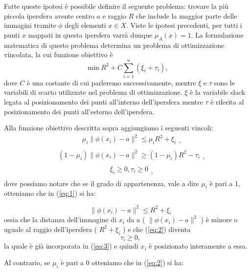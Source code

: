 \documentclass[12pt,italian]{report}
\begin{document}
Fatte queste ipotesi è possibile definire il seguente problema:
trovare la più piccola ipersfera avente centro $a$ e raggio $R$ che include la maggior parte delle immagini tramite $ \phi $ degli elementi $ x \in X $. Viste le ipotesi precedenti, per tutti i punti $ x $ mappati in questa ipersfera varrà dunque $ \mu_A(x) = 1 $. La formulazione matematica di questo problema determina un problema di ottimizzazione vincolata, la cui funzione obiettivo è
\[ \min R^2 + C\sum_{i=1}^{n} (\xi_{i} + \tau_{i}), \]
dove $ C $ è una costante di cui parleremo successivamente, mentre $ \xi $ e $ \tau $ sono le variabili di scarto utilizzate nel problema di ottimizzazione. $ \xi $ è la variabile slack legata al posizionamento dei punti all'interno dell'ipersfera mentre $ \tau $ è riferita al posizionamento dei punti all'esterno dell'ipersfera.

Alla funzione obiettivo descritta sopra aggiungiamo i seguenti vincoli:
\begin{equation}
\label{eq:1}
\begin{aligned}
\quad \mu_{i} \lVert \phi(x_{i}) - a \rVert ^2 \leq \mu_{i} R^2 + \xi_{i}\\
\end{aligned},
\end{equation}
\begin{equation}
\label{eq:2}
\begin{aligned}
\quad (1 - \mu_{i}) \lVert \phi(x_{i}) - a \rVert ^2 \geq (1 - \mu_{i})R^2 - \tau_{i} \\
\end{aligned},
\end{equation}
\begin{equation}
\label{eq:3}
\begin{aligned}
\quad \xi_{i} \geq 0, \tau_{i} \geq 0 \\
\end{aligned},
\end{equation}
dove possiamo notare che se il grado di appartenenza, vale a dire $  \mu_{i} $ è pari a 1, otteniamo che in (\ref{eq:1}) si ha:

\[\quad \lVert \phi(x_{i}) - a \rVert ^2 \leq R^2 + \xi_{i} \]
ossia che la distanza dell'immagine di $ x_{i} $ da $a$ ( $\lVert \phi(x_{i}) - a \rVert ^2$ ) è minore o uguale al raggio dell'ipersfera ( $R^2 + \xi_{i}$ ) e che (\ref{eq:2}) diventa 
\[\quad \tau_i \geq 0, \]
la quale è già incorporata in (\ref{eq:3}) e quindi $x_i$ è posizionato interamente a essa.

Al contrario, se $ \mu_{i} $ è pari a $ 0 $ otteniamo che in (\ref{eq:2}) si ha:
\end{document}
